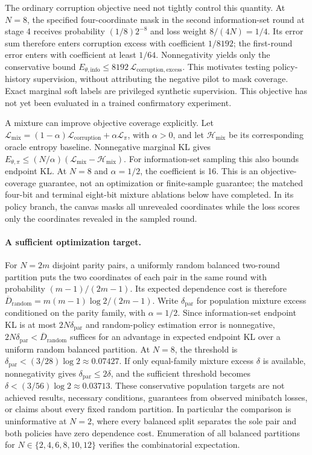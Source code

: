The ordinary corruption objective need not tightly control this quantity. At $N=8$, the specified four-coordinate mask in the second information-set round at stage 4 receives probability $(1/8)2^{-8}$ and loss weight $8/(4N)=1/4$. Its error sum therefore enters corruption excess with coefficient $1/8192$; the first-round error enters with coefficient at least $1/64$. Nonnegativity yields only the conservative bound $E_{\theta,\mathrm{info}}\leq8192\,\mathcal L_{\mathrm{corruption,excess}}$. This motivates testing policy-history supervision, without attributing the negative pilot to mask coverage. Exact marginal soft labels are privileged synthetic supervision. This objective has not yet been evaluated in a trained confirmatory experiment.

A mixture can improve objective coverage explicitly. Let $\mathcal L_{\mathrm{mix}}=(1-\alpha)\mathcal L_{\mathrm{corruption}}+\alpha\mathcal L_\pi$, with $\alpha>0$, and let $\mathcal H_{\mathrm{mix}}$ be its corresponding oracle entropy baseline. Nonnegative marginal KL gives $E_{\theta,\pi}\leq (N/\alpha)(\mathcal L_{\mathrm{mix}}-\mathcal H_{\mathrm{mix}})$. For information-set sampling this also bounds endpoint KL. At $N=8$ and $\alpha=1/2$, the coefficient is 16. This is an objective-coverage guarantee, not an optimization or finite-sample guarantee; the matched four-bit and terminal eight-bit mixture ablations below have completed. In its policy branch, the canvas masks all unrevealed coordinates while the loss scores only the coordinates revealed in the sampled round.

\paragraph{A sufficient optimization target.}
For $N=2m$ disjoint parity pairs, a uniformly random balanced two-round partition puts the two coordinates of each pair in the same round with probability $(m-1)/(2m-1)$. Its expected dependence cost is therefore $\overline D_{\mathrm{random}}=m(m-1)\log2/(2m-1)$. Write $\delta_{\mathrm{par}}$ for population mixture excess conditioned on the parity family, with $\alpha=1/2$. Since information-set endpoint KL is at most $2N\delta_{\mathrm{par}}$ and random-policy estimation error is nonnegative, $2N\delta_{\mathrm{par}}<\overline D_{\mathrm{random}}$ suffices for an advantage in expected endpoint KL over a uniform random balanced partition. At $N=8$, the threshold is $\delta_{\mathrm{par}}<(3/28)\log2\approx0.07427$. If only equal-family mixture excess $\delta$ is available, nonnegativity gives $\delta_{\mathrm{par}}\leq2\delta$, and the sufficient threshold becomes $\delta<(3/56)\log2\approx0.03713$. These conservative population targets are not achieved results, necessary conditions, guarantees from observed minibatch losses, or claims about every fixed random partition. In particular the comparison is uninformative at $N=2$, where every balanced split separates the sole pair and both policies have zero dependence cost. Enumeration of all balanced partitions for $N\in\{2,4,6,8,10,12\}$ verifies the combinatorial expectation.

